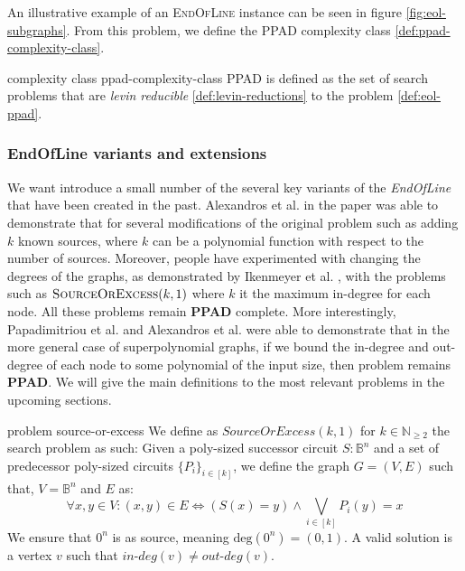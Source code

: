 \vspace{0.2cm}

An illustrative example of an \textsc{EndOfLine} instance can be seen in figure \ref{fig:eol-subgraphs}.
From this problem, we define the \textsc{PPAD} complexity class \ref{def:ppad-complexity-class}.

\begin{definitionbox}{ complexity class \cite{papadimitriou_ComplexityParityArgument_1994}}{ppad-complexity-class}
    \textsc{PPAD} is defined as the set of search problems that
    are \textit{levin reducible} \ref{def:levin-reductions} to the  problem \ref{def:eol-ppad}.
\end{definitionbox}

\subsubsection{EndOfLine variants and extensions}
We want introduce a small number of the several key variants of the \textit{EndOfLine} that have been created in the past.
Alexandros et al. in the paper {} was able to demonstrate that for several modifications of the original problem such as adding
$k$ known sources, where $k$ can be a polynomial function with respect to the number of sources. Moreover, people
have experimented with changing the degrees of the graphs, as demonstrated by Ikenmeyer et al. \cite{ikenmeyer_WhatWhatNot_2022},
with the problems such as $\textsc{SourceOrExcess}(k,1)$ where $k$ it the maximum in-degree for each node.
All these problems remain \textbf{PPAD} complete. More interestingly, Papadimitriou et al. {} and
Alexandros et al. {} were able to demonstrate that in the more general case of superpolynomial graphs,
if we bound the in-degree and out-degree of each node to some polynomial of the input size, then problem remains \textbf{PPAD}.
We will give the main definitions to the most relevant problems in the upcoming sections.

\begin{definitionbox}{ problem \cite{ikenmeyer_WhatWhatNot_2022}}{source-or-excess}
    We define as $\textit{SourceOrExcess}(k,1)$ for $k \in \mathbb{N}_{\geq 2}$
    the search problem as such: Given a poly-sized successor circuit $S : \mathbb{B}^n$
    and a set of predecessor poly-sized circuits $\{P_i\}_{i \in [k]}$, we define
    the graph $G = (V,E)$ such that, $V = \mathbb{B}^n$ and $E$ as:
    $$
        \forall x, y \in V: (x,y) \in E \iff (S(x) = y) \wedge \bigvee_{i \in [k]} P_i(y) = x
    $$
    We ensure that $0^n$ is as source, meaning $\text{deg}(0^n) = (0,1)$.
    A valid solution is a vertex $v$ such that $\textit{in-deg}(v) \neq \textit{out-deg}(v)$.
\end{definitionbox}


